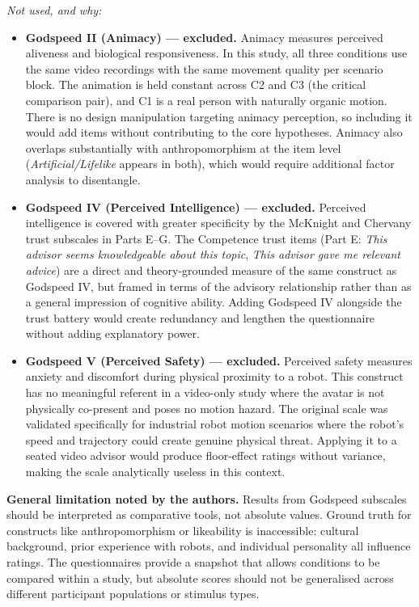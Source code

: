 \documentclass[11pt, a4paper]{article}
\begin{document}
\textit{Not used, and why:}
\begin{itemize}[leftmargin=2em]
  \item \textbf{Godspeed II (Animacy) --- excluded.} Animacy measures perceived aliveness and biological responsiveness. In this study, all three conditions use the same video recordings with the same movement quality per scenario block. The animation is held constant across C2 and C3 (the critical comparison pair), and C1 is a real person with naturally organic motion. There is no design manipulation targeting animacy perception, so including it would add items without contributing to the core hypotheses. Animacy also overlaps substantially with anthropomorphism at the item level (\textit{Artificial/Lifelike} appears in both), which would require additional factor analysis to disentangle.
  \item \textbf{Godspeed IV (Perceived Intelligence) --- excluded.} Perceived intelligence is covered with greater specificity by the McKnight and Chervany trust subscales in Parts E--G. The Competence trust items (Part E: \textit{This advisor seems knowledgeable about this topic}, \textit{This advisor gave me relevant advice}) are a direct and theory-grounded measure of the same construct as Godspeed IV, but framed in terms of the advisory relationship rather than as a general impression of cognitive ability. Adding Godspeed IV alongside the trust battery would create redundancy and lengthen the questionnaire without adding explanatory power.
  \item \textbf{Godspeed V (Perceived Safety) --- excluded.} Perceived safety measures anxiety and discomfort during physical proximity to a robot. This construct has no meaningful referent in a video-only study where the avatar is not physically co-present and poses no motion hazard. The original scale was validated specifically for industrial robot motion scenarios where the robot's speed and trajectory could create genuine physical threat. Applying it to a seated video advisor would produce floor-effect ratings without variance, making the scale analytically useless in this context.
\end{itemize}

\textbf{General limitation noted by the authors.} Results from Godspeed subscales should be interpreted as comparative tools, not absolute values. Ground truth for constructs like anthropomorphism or likeability is inaccessible: cultural background, prior experience with robots, and individual personality all influence ratings. The questionnaires provide a snapshot that allows conditions to be compared within a study, but absolute scores should not be generalised across different participant populations or stimulus types.
\end{document}
